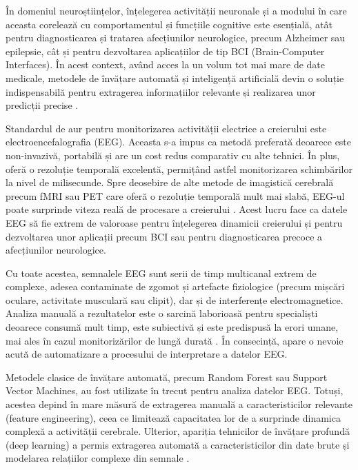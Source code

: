 \documentclass[12pt,a4paper]{report}
\theoremstyle{definition}
\theoremstyle{remark}
\begin{document}
În domeniul neuroștiințelor, înțelegerea activității neuronale și a modului în care aceasta corelează cu comportamentul și funcțiile cognitive este esențială, atât pentru diagnosticarea și tratarea afecțiunilor neurologice, precum Alzheimer sau epilepsie, cât și pentru dezvoltarea aplicațiilor de tip BCI (Brain-Computer Interfaces). În acest context, având acces la un volum tot mai mare de date medicale, metodele de învățare automată și inteligență artificială devin o soluție indispensabilă pentru extragerea informațiilor relevante și realizarea unor predicții precise \cite{hu2024self}.

Standardul de aur pentru monitorizarea activității electrice a creierului este electroencefalografia (EEG). Aceasta s-a impus ca metodă preferată deoarece este non-invazivă, portabilă și are un cost redus comparativ cu alte tehnici. În plus, oferă o rezoluție temporală excelentă, permițând astfel monitorizarea schimbărilor la nivel de milisecunde. Spre deosebire de alte metode de imagistică cerebrală precum fMRI sau PET care oferă o rezoluție temporală mult mai slabă, EEG-ul poate surprinde viteza reală de procesare a creierului \cite{klepl2023gnn}. Acest lucru face ca datele EEG să fie extrem de valoroase pentru înțelegerea dinamicii creierului și pentru dezvoltarea unor aplicații precum BCI sau pentru diagnosticarea precoce a afecțiunilor neurologice.

Cu toate acestea, semnalele EEG sunt serii de timp multicanal extrem de complexe, adesea contaminate de zgomot și artefacte fiziologice (precum mișcări oculare, activitate musculară sau clipit), dar și de interferențe electromagnetice. Analiza manuală a rezultatelor este o sarcină laborioasă pentru specialiști deoarece consumă mult timp, este subiectivă și este predispusă la erori umane, mai ales în cazul monitorizărilor de lungă durată \cite{awais2024graphical}. În consecință, apare o nevoie acută de automatizare a procesului de interpretare a datelor EEG.

Metodele clasice de învățare automată, precum Random Forest sau Support Vector Machines, au fost utilizate în trecut pentru analiza datelor EEG. Totuși, acestea depind în mare măsură de extragerea manuală a caracteristicilor relevante (feature engineering), ceea ce limitează capacitatea lor de a surprinde dinamica complexă a activității cerebrale. Ulterior, apariția tehnicilor de învățare profundă (deep learning) a permis extragerea automată a caracteristicilor din date brute și modelarea relațiilor complexe din semnale \cite{rahman2025advancement}.
\end{document}
